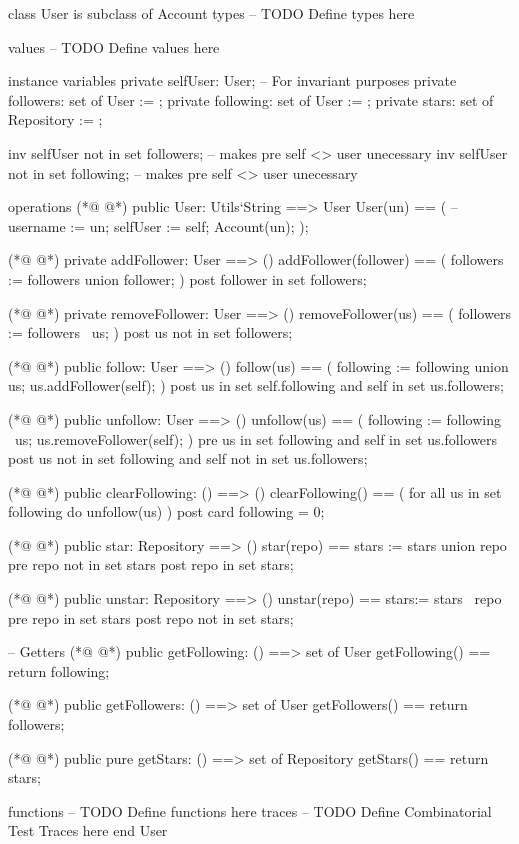 \begin{vdmpp}[breaklines=true]
class User is subclass of Account
types
-- TODO Define types here

values
-- TODO Define values here

instance variables
 private selfUser: User; -- For invariant purposes
 private followers: set of User := {};
 private following: set of User := {};
 private stars: set of Repository := {};
 
 inv selfUser not in set followers; -- makes pre self <> user unecessary
 inv selfUser not in set following; -- makes pre self <> user unecessary
 
operations
(*@
\label{User:18}
@*)
 public User: Utils`String ==> User
 User(un) == (
--  username := un;
  selfUser := self;
  Account(un);
 );
 
(*@
\label{addFollower:25}
@*)
 private addFollower: User ==> ()
 addFollower(follower) == (
  followers := followers union {follower};
 )
 post follower in set followers;
 
(*@
\label{removeFollower:31}
@*)
 private removeFollower: User ==> ()
 removeFollower(us) == (
  followers := followers \ {us};
 )
 post us not in set followers;
 
(*@
\label{follow:37}
@*)
 public follow: User ==> ()
 follow(us) == (
  following := following union {us};
  us.addFollower(self);
 )
 post us in set self.following and
    self in set us.followers;
 
(*@
\label{unfollow:45}
@*)
 public unfollow: User ==> ()
 unfollow(us) == (
  following := following \ {us};
  us.removeFollower(self);
 )
 pre us in set following and self in set us.followers
 post us not in set following and self not in set us.followers;
 
(*@
\label{clearFollowing:53}
@*)
 public clearFollowing: () ==> ()
 clearFollowing() == (
  for all us in set following
   do unfollow(us)
 )
 post card following = 0;
 
(*@
\label{star:60}
@*)
 public star: Repository ==> ()
 star(repo) == stars := stars union {repo}
 pre repo not in set stars
 post repo in set stars;
 
(*@
\label{unstar:65}
@*)
 public unstar: Repository ==> ()
 unstar(repo) == stars:= stars \ {repo}
 pre repo in set stars
 post repo not in set stars;
 
 -- Getters
(*@
\label{getFollowing:71}
@*)
 public getFollowing: () ==> set of User
 getFollowing() == return following;
 
(*@
\label{getFollowers:74}
@*)
 public getFollowers: () ==> set of User
 getFollowers() == return followers;
 
(*@
\label{getStars:77}
@*)
 public pure getStars: () ==> set of Repository
 getStars() == return stars;
 
functions
-- TODO Define functions here
traces
-- TODO Define Combinatorial Test Traces here
end User
\end{vdmpp}
